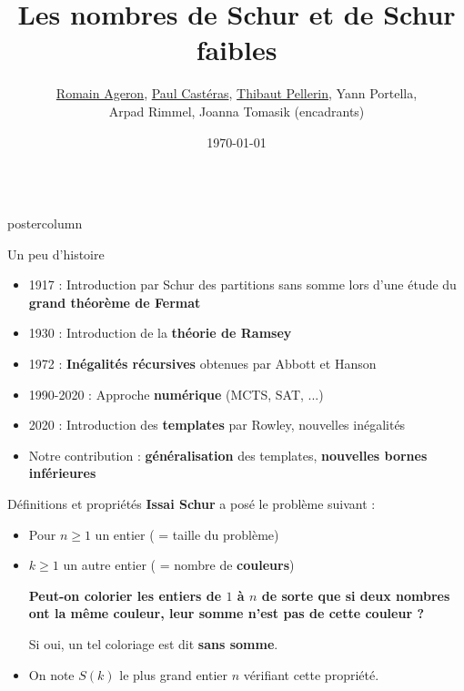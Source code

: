 \documentclass[roundedcorners=true, titleposition=left]{beamerthemeruhuisstijlposter}
\institute[CLS]{CentraleSupélec, Pôle Projet \og{}Formation à la recherche \fg{}}
\title{Les nombres de Schur et de Schur faibles}
\date{\today}
\author{\underline{Romain Ageron}, \underline{Paul Castéras}, \underline{Thibaut Pellerin}, Yann Portella,\\ Arpad Rimmel, Joanna Tomasik (encadrants)}
\begin{document}

\begin{frame}
\begin{columns}
\begin{column}{0.49\textwidth}
\begin{beamercolorbox}[center, wd=\textwidth]{postercolumn}
\begin{minipage}[T]{0.95\textwidth}
\parbox[t][\columnheight]{\textwidth}{%
    \begin{block}{Un peu d'histoire}
    	\begin{itemize}
    	    \item 1917 : Introduction par Schur des partitions sans somme lors d'une étude du \textbf{grand théorème de Fermat}
    	    \item 1930 : Introduction de la \textbf{théorie de Ramsey}
    	    \item 1972 : \textbf{Inégalités récursives} obtenues par Abbott et Hanson 
    	    \item 1990-2020 : Approche \textbf{numérique} (MCTS, SAT, ...)
    	    \item 2020 : Introduction des \textbf{templates} par Rowley, nouvelles inégalités
    	    \item Notre contribution : \textbf{généralisation} des templates, \textbf{nouvelles bornes inférieures}
    	\end{itemize}
    \end{block}
  \begin{block}{Définitions et propriétés}
	\textbf{Issai Schur} a posé le problème suivant :

	\begin{itemize}
		\item Pour \(n \geqslant 1\) un entier ( = taille du problème)
		\item \(k \geqslant 1\) un autre entier ( = nombre de \textbf{couleurs})
	
	\vspace{1ex}
	\textbf{Peut-on colorier les entiers de \(1\) à \(n\) de sorte que si deux 
	nombres ont la même couleur, leur somme n'est pas de cette couleur ?}
	
    \vspace{1ex}
    Si oui, un tel coloriage est dit \textbf{sans somme}.
			\vspace{1ex}

		\item On note \(S(k)\) le plus grand entier \(n\) vérifiant cette propriété.
\vspace{2ex}


\end{itemize}
\end{block}}
\end{minipage}
\end{beamercolorbox}
\end{column}
\end{columns}
\end{frame}
\end{document}
